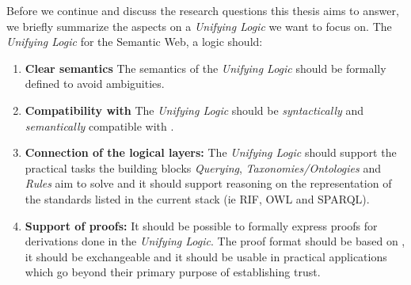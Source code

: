 % 
% 

Before we continue and discuss the research questions this thesis aims to answer, 
we briefly summarize the aspects on a \emph{Unifying Logic} we want to focus on. The \emph{Unifying Logic} for the Semantic Web, a logic should:
\begin{enumerate}
\item \textbf{Clear semantics} %
The semantics of the \emph{Unifying Logic} should be formally defined to avoid ambiguities.
\item \textbf{Compatibility with \rdf} %
The \emph{Unifying Logic} should be \emph{syntactically} and \emph{semantically} compatible with \rdf.
\item \textbf{Connection of the logical layers:} %
The \emph{Unifying Logic}  should support the practical tasks the 
 building blocks \emph{Querying}, \emph{Taxonomies/Ontologies}
and \emph{Rules} aim to solve and 
it should support reasoning on the \rdf representation of the standards listed in the current stack (ie RIF, OWL and SPARQL).
\item \textbf{Support of proofs:} It should be possible to formally express proofs for derivations done in the \emph{Unifying Logic}. The proof format should be based on \rdf, it should be 
exchangeable and it should be usable in practical applications which go  beyond their primary purpose of establishing trust.
\end{enumerate}



